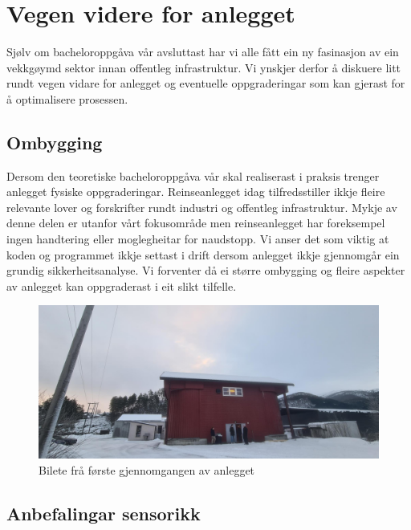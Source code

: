 \section{Vegen videre for anlegget}
\thispagestyle{fancy}

Sjølv om bacheloroppgåva vår avsluttast har vi alle fått ein ny fasinasjon av ein vekkgøymd sektor innan offentleg infrastruktur. 
Vi ynskjer derfor å diskuere litt rundt vegen vidare for anlegget og eventuelle oppgraderingar som kan gjerast
for å optimalisere prosessen.

\subsection{Ombygging}

Dersom den teoretiske bacheloroppgåva vår skal realiserast i praksis trenger anlegget fysiske oppgraderingar.
Reinseanlegget idag tilfredsstiller ikkje fleire relevante lover og forskrifter rundt industri og offentleg infrastruktur.
Mykje av denne delen er utanfor vårt fokusområde men reinseanlegget har foreksempel ingen handtering eller moglegheitar for naudstopp.
Vi anser det som viktig at koden og programmet ikkje settast i drift dersom anlegget ikkje gjennomgår ein grundig sikkerheitsanalyse.
Vi forventer då ei større ombygging og fleire aspekter av anlegget kan oppgraderast i eit slikt tilfelle. \newline \newline

\begin{figure}[htbp]
    \centering
    \includegraphics[width=1\textwidth]{Bilder/SandeGjennomgang.jpg}
    \caption{Bilete frå første gjennomgangen av anlegget}\label{fig:Bilete Gjennomgang}
\end{figure}

\newpage

\subsection{Anbefalingar sensorikk}

